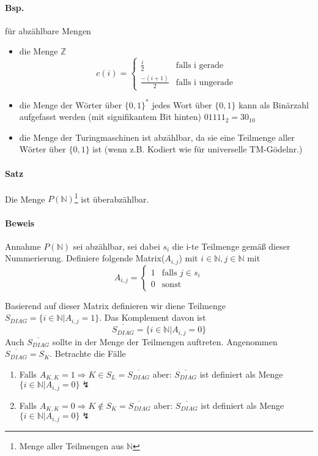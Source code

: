 \paragraph*{Bsp.} für abzählbare Mengen
\begin{itemize}
	\item die Menge $\mathbb{Z}$ $$ c(i)= \begin{cases}\frac{i}{2} & \text{falls i gerade}\\ \frac{-(i+1)}{2} & \text{falls i ungerade}\end{cases} $$ %
	\item die Menge der Wörter über $\{0,1\}^*$ jedes Wort über $\{0,1\}$ kann als Binärzahl aufgefasst werden (mit signifikantem Bit hinten) $01111_2=30_{10}$
	\item die Menge der Turingmaschinen ist abzählbar, da sie eine Teilmenge aller Wörter über $\{0,1\}$ ist (wenn z.B. Kodiert wie für universelle TM-Gödelnr.)
\end{itemize}

\paragraph*{Satz} Die Menge $P(\mathbb{N})$\footnote{Menge aller Teilmengen aus $\mathbb{N}$} ist überabzählbar.

\paragraph*{Beweis} Annahme $P(\mathbb{N})$ sei abzählbar, sei dabei $s_i$ die i-te Teilmenge gemäß dieser Nummerierung. Definiere folgende Matrix($A_{i,j}$) mit $i\in\mathbb{N},j\in\mathbb{N}$ mit $$ A_{i,j} = \begin{cases}1&\text{falls } j\in s_i \\ 0 & \text{sonst}\end{cases} $$ 

\para{} Basierend auf dieser Matrix definieren wir diene Teilmenge $S_{DIAG}=\{ i\in\mathbb{N}|A_{i,j}=1 \}$. Das Komplement davon ist $$ \overline{S_{DIAG}}=\{i\in\mathbb{N}|A_{i,j}=0\} $$ Auch $\overline{S_{DIAG}}$ sollte in der Menge der Teilmengen auftreten. Angenommen $\overline{S_{DIAG}} = S_K$. Betrachte die Fälle
\begin{enumerate}
	\item Falls $A_{K,K}=1 \Rightarrow K \in S_L = \overline{S_{DIAG}}$ aber: $\overline{S_{DIAG}}$ ist definiert als Menge $\{i\in\mathbb{N}|A_{i,j}=0\} \lightning$ 
	\item Falls $A_{K,K}=0 \Rightarrow K \not\in S_K = \overline{S_{DIAG}}$ aber: $\overline{S_{DIAG}}$ ist definiert als Menge $\{i\in\mathbb{N}|A_{i,j}=0\} \lightning$
\end{enumerate}

